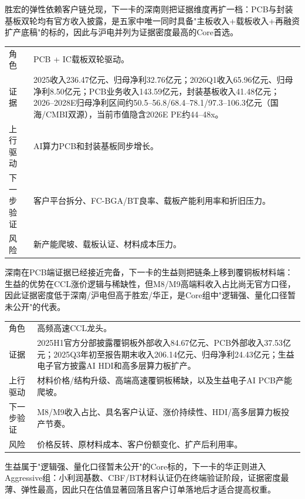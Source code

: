 胜宏的弹性依赖客户链兑现，下一卡的深南则把证据维度再扩一档：PCB与封装基板双轮均有官方收入披露，是五家中唯一同时具备"主板收入+载板收入+再融资扩产底稿"的标的，因此与沪电并列为证据密度最高的Core首选。

\begin{exhibitbox}
\small
\begin{tabularx}{\textwidth}{L{2.6cm}X}
\toprule
角色 & PCB + IC载板双轮驱动。 \\
证据 & 2025收入236.47亿元、归母净利32.76亿元；2026Q1收入65.96亿元、归母净利8.50亿元；PCB业务收入143.59亿元，封装基板收入41.48亿元；2026--2028E归母净利区间约50.5--56.8/68.4--78.1/97.3--106.3亿元（国海/CMBI双源），当前市值隐含2026E PE约44--48x。 \\
上行驱动 & AI算力PCB和封装基板同步增长。 \\
下一步验证 & 客户平台拆分、FC-BGA/BT良率、载板产能利用率和折旧压力。 \\
风险 & 新产能爬坡、载板认证、材料成本压力。 \\
\bottomrule
\end{tabularx}
\end{exhibitbox}

深南在PCB端证据已经接近完备，下一卡的生益则把链条上移到覆铜板材料端：生益的优势在CCL涨价逻辑与稀缺性，但M8/M9高端料收入占比尚无官方口径，因此证据密度低于深南/沪电但高于胜宏/华正，是Core组中"逻辑强、量化口径暂未公开"的代表。

\begin{exhibitbox}
\small
\begin{tabularx}{\textwidth}{L{2.6cm}X}
\toprule
角色 & 高频高速CCL龙头。 \\
证据 & 2025H1官方分部披露覆铜板外部收入84.67亿元、PCB外部收入37.53亿元；2025Q3年初至报告期末收入206.14亿元、归母净利24.43亿元；生益电子官方披露AI HDI和高多层算力板扩产。 \\
上行驱动 & 材料价格/结构升级、高端高速覆铜板稀缺，以及生益电子AI PCB产能爬坡。 \\
下一步验证 & M8/M9收入占比、具名客户认证、涨价持续性、HDI/高多层算力板投产节奏。 \\
风险 & 价格反转、原材料成本、客户份额变化、扩产后利用率。 \\
\bottomrule
\end{tabularx}
\end{exhibitbox}

生益属于"逻辑强、量化口径暂未公开"的Core标的，下一卡的华正则进入Aggressive组：小利润基数、CBF/BT材料认证仍在终端验证阶段，证据密度最薄、弹性最高，因此只在估值显著回落且客户订单落地后才适合提高权重。

